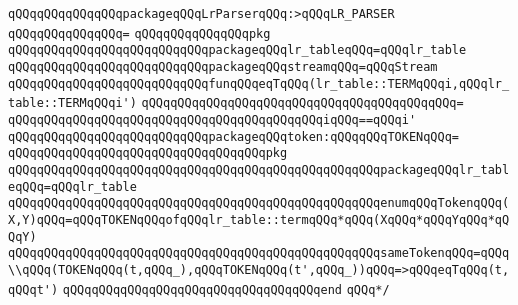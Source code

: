\newline
\verb|qQQqqQQqqQQqqQQqpackageqQQqLrParserqQQq:>qQQqLR_PARSER|\newline
\verb|qQQqqQQqqQQqqQQq=|\newline
\verb|qQQqqQQqqQQqqQQqpkg|\newline
\verb|qQQqqQQqqQQqqQQqqQQqqQQqqQQqpackageqQQqlr_tableqQQq=qQQqlr_table|\newline
\verb|qQQqqQQqqQQqqQQqqQQqqQQqqQQqpackageqQQqstreamqQQq=qQQqStream|\newline
\newline
\verb|qQQqqQQqqQQqqQQqqQQqqQQqqQQqfunqQQqeqTqQQq(lr_table::TERMqQQqi,qQQqlr_table::TERMqQQqi')|\newline
\verb|qQQqqQQqqQQqqQQqqQQqqQQqqQQqqQQqqQQqqQQqqQQq=|\newline
\verb|qQQqqQQqqQQqqQQqqQQqqQQqqQQqqQQqqQQqqQQqqQQqiqQQq==qQQqi'|\newline
\newline
\verb|qQQqqQQqqQQqqQQqqQQqqQQqqQQqpackageqQQqtoken:qQQqqQQqTOKENqQQq=|\newline
\verb|qQQqqQQqqQQqqQQqqQQqqQQqqQQqqQQqqQQqpkg|\newline
\verb|qQQqqQQqqQQqqQQqqQQqqQQqqQQqqQQqqQQqqQQqqQQqqQQqqQQqpackageqQQqlr_tableqQQq=qQQqlr_table|\newline
\verb|qQQqqQQqqQQqqQQqqQQqqQQqqQQqqQQqqQQqqQQqqQQqqQQqqQQqenumqQQqTokenqQQq(X,Y)qQQq=qQQqTOKENqQQqofqQQqlr_table::termqQQq*qQQq(XqQQq*qQQqYqQQq*qQQqY)|\newline
\verb|qQQqqQQqqQQqqQQqqQQqqQQqqQQqqQQqqQQqqQQqqQQqqQQqqQQqsameTokenqQQq=qQQq\\qQQq(TOKENqQQq(t,qQQq_),qQQqTOKENqQQq(t',qQQq_))qQQq=>qQQqeqTqQQq(t,qQQqt')|\newline
\verb|qQQqqQQqqQQqqQQqqQQqqQQqqQQqqQQqqQQqend|\newline
\newline
\newline
\newline
\newline
\verb|qQQq*/|\newline
\newline
\newline

